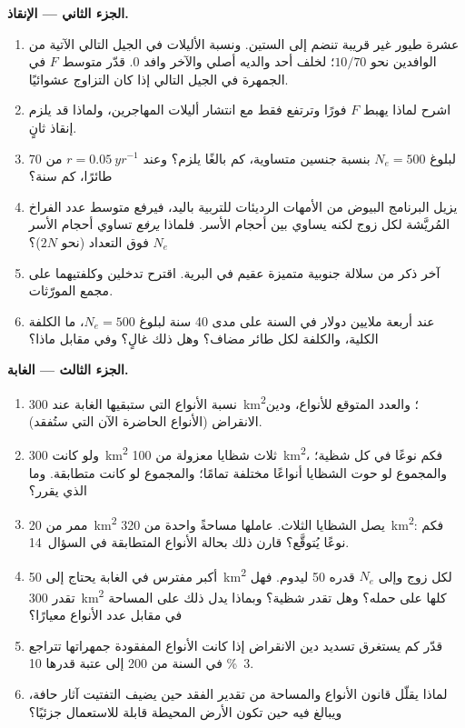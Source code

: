 \begin{problem}
\medskip
\noindent\textbf{الجزء الثاني --- الإنقاذ.}
\begin{enumerate}[resume]
  \item عشرة طيور غير قريبة تنضم إلى الستين. ونسبة الأليلات في
        الجيل التالي الآتية من الوافدين نحو $10/70$؛  لخلف أحد والديه أصلي والآخر وافد
        $0$. قدّر متوسط $F$ في الجمهرة في
        الجيل التالي إذا كان التزاوج عشوائيًا.
  \item اشرح لماذا يهبط $F$ فورًا وترتفع 
        فقط مع انتشار أليلات المهاجرين، ولماذا قد يلزم
        إنقاذ ثانٍ.
  \item لبلوغ $N_{e} = 500$ بنسبة جنسين متساوية، كم بالغًا
        يلزم؟ وعند $r = \qty{0.05}{yr^{-1}}$ من 70 طائرًا، كم
        سنة؟
  \item يزيل البرنامج البيوض من الأمهات الرديئات للتربية
        باليد، فيرفع متوسط عدد الفراخ المُريَّشة لكل زوج لكنه يساوي
        بين أحجام الأسر. فلماذا \emph{يرفع} تساوي أحجام الأسر
        $N_{e}$ فوق التعداد (نحو $2N$)؟
  \item آخر ذكر من سلالة جنوبية متميزة عقيم في
        البرية. اقترح تدخلين وكلفتيهما على مجمع
        المورّثات.
  \item عند أربعة ملايين دولار في السنة على مدى 40 سنة لبلوغ
        $N_{e} = 500$، ما الكلفة الكلية، والكلفة لكل طائر مضاف؟ وهل ذلك غالٍ؟ وفي مقابل
        ماذا؟
\end{enumerate}

\medskip
\noindent\textbf{الجزء الثالث --- الغابة.}
\begin{enumerate}[resume]
  \item نسبة الأنواع التي ستبقيها الغابة عند \qty{300}{km^2}؛
        والعدد المتوقع للأنواع، ودين الانقراض (الأنواع
        الحاضرة الآن التي ستُفقد).
  \item ولو كانت \qty{300}{km^2} ثلاث شظايا معزولة من
        \qty{100}{km^2}، فكم نوعًا في كل شظية؛ والمجموع لو حوت الشظايا
        أنواعًا مختلفة تمامًا؛ والمجموع لو كانت متطابقة. وما
        الذي يقرر؟
  \item ممر من \qty{20}{km^2} يصل الشظايا الثلاث. عاملها
        مساحةً واحدة من \qty{320}{km^2}: فكم نوعًا يُتوقَّع؟ قارن
        ذلك بحالة الأنواع المتطابقة في السؤال~14.
  \item أكبر مفترس في الغابة يحتاج إلى \qty{50}{km^2} لكل زوج
        وإلى $N_{e}$ قدره 50 ليدوم. فهل تقدر \qty{300}{km^2} كلها على
        حمله؟ وهل تقدر شظية؟ وبماذا يدل ذلك على المساحة في مقابل عدد
        الأنواع معيارًا؟
  \item قدّر كم يستغرق تسديد دين الانقراض إذا كانت
        الأنواع المفقودة جمهراتها تتراجع \qty{3}{\%} في السنة
        من 200 إلى عتبة  قدرها 10.
  \item لماذا يقلّل قانون الأنواع والمساحة من تقدير الفقد حين
        يضيف التفتيت آثار حافة، ويبالغ فيه حين تكون
        الأرض المحيطة قابلة للاستعمال جزئيًا؟
\end{enumerate}


\end{problem}
